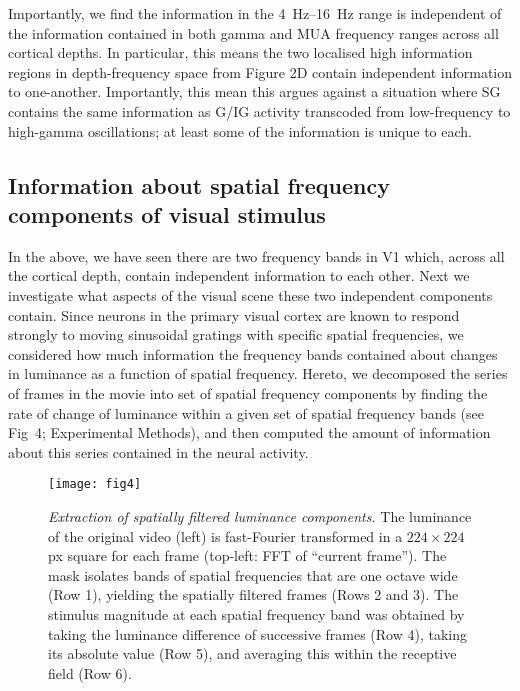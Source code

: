 Importantly, we find the information in the \SIrange{4}{16}{Hz} range is independent of the information contained in both gamma and \ac{MUA} frequency ranges across all cortical depths.
In particular, this means the two localised high information regions in depth-frequency space from Figure 2D contain independent information to one-another.
Importantly, this mean this argues against a situation where \ac{SG} contains the same information as \ac{G}/\ac{IG} activity transcoded from low-frequency to high-gamma oscillations; at least some of the information is unique to each.

\subsection{Information about spatial frequency components of visual stimulus}
In the above, we have seen there are two frequency bands in \ac{V1} which, across all the cortical depth, contain independent information to each other.
Next we investigate what aspects of the visual scene these two independent components contain.
Since neurons in the primary visual cortex are known to respond strongly to moving sinusoidal gratings with specific spatial frequencies, we considered how much information the frequency bands contained about changes in luminance as a function of spatial frequency.
Hereto, we decomposed the series of frames in the movie into set of spatial frequency components by finding the rate of change of luminance within a given set of spatial frequency bands (see Fig~4; Experimental Methods), and then computed the amount of information about this series contained in the neural activity.

\begin{figure}[htbp]
\centering \texttt{[image: fig4]}
%
\caption{%
\textit{Extraction of spatially filtered luminance components.}
The luminance of the original video (left) is 
fast-Fourier transformed in a $224 \times 224$ px square for each frame (top-left: \ac{FFT} of 
``current frame'').
The mask isolates bands of spatial frequencies that are one octave wide (Row 1), yielding 
the spatially filtered frames (Rows 2 and 3).
The stimulus magnitude at each spatial frequency band was obtained 
by taking the luminance difference of successive frames (Row 4), 
taking its absolute value (Row 5), 
and averaging this within the receptive field (Row 6).
}%
\label{fig:lam_4}
%
\end{figure}


